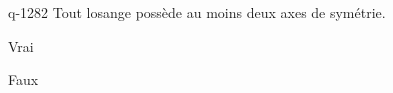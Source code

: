 \begin{truefalse}{q-1282}
Tout losange possède au moins deux axes de symétrie.
\item* Vrai
\item Faux
\end{truefalse}

